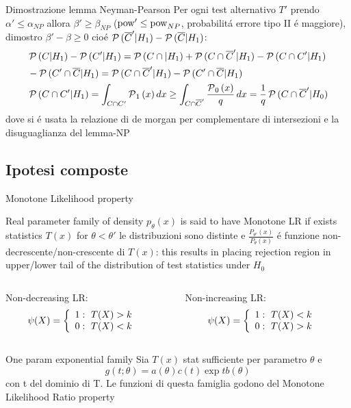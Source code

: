 \documentclass[asd-beamer.tex]{subfiles}
\begin{document}
\begin{wordonframe}{Dimostrazione lemma Neyman-Pearson}
Per ogni test alternativo $T'$ prendo $\alpha'\leq\alpha_{NP}$ allora $\beta'\geq\beta_{NP}$ ($\operatorname{pow}'\leq\operatorname{pow}_{NP}$, probabilit\'a errore tipo II \'e maggiore), dimostro $\beta'-\beta\geq0$ cio\'e $\operatorname{\mathcal{P}}{(\overline{C}'|H_1)}-\operatorname{\mathcal{P}}{(\overline{C}|H_1)}$:
\begin{align*}
&\operatorname{\mathcal{P}}{(C|H_1)}-\operatorname{\mathcal{P}}{(C'|H_1)}=\operatorname{\mathcal{P}}{(C\cap|H_1)}+\operatorname{\mathcal{P}}{(C\cap\overline{C}'|H_1)}-\operatorname{\mathcal{P}}{(C\cap C'|H_1)}\\
&-\operatorname{\mathcal{P}}{(C'\cap\overline{C}|H_1)}=\operatorname{\mathcal{P}}{(C\cap\overline{C}'|H_1)}-\operatorname{\mathcal{P}}{(C'\cap\overline{C}|H_1)}\\
&\operatorname{\mathcal{P}}{(C\cap C'|H_1)}=\int_{C\cap C'}\operatorname{\mathcal{P}}_1{(x)}\,dx\geq\int_{C\cap \overline{C}'}\frac{\operatorname{\mathcal{P}}_0{(x)}}{q}\,dx=\frac{1}{q}\operatorname{\mathcal{P}}{(C\cap\overline{C}'|H_0)}
\end{align*}
dove si \'e usata la relazione di de morgan per complementare di intersezioni e la disuguaglianza del lemma-NP
\end{wordonframe}

\subsection{Ipotesi composte}

\begin{frame}{Monotone Likelihood property}\frameintoc
\begin{block}{}
Real parameter family of density $p_{\theta}(x)$ is said to have Monotone LR if exists statistics $T(x)$ for $\theta<\theta'$ le distribuzioni sono distinte e $\frac{P_{\theta'}(x)}{P_{\theta}(x)}$ \'e funzione non-decrescente/non-crescente di $T(x)$: this results in placing rejection region in upper/lower tail of the distribution of test statistics under $H_0$
\begin{columns}[T]
	\begin{column}{0.5\textwidth}
		Non-decreasing LR:
		\begin{align*}
		&\psi(X)=\left\{\begin{array}{l}1:\ T(X)>k\\0:\ T(X)<k\\ \end{array}\right.
		\end{align*}
	\end{column}
	\begin{column}{0.5\textwidth}
		Non-increasing LR:
		\begin{align*}
		&\psi(X)=\left\{\begin{array}{l}1:\ T(X)<k\\0:\ T(X)>k\\ \end{array}\right.
		\end{align*}
	\end{column}
\end{columns}
\end{block}
\begin{block}{One param exponential family}
Sia $T(x)$ stat sufficiente per parametro $\theta$ e 
\begin{equation*}
g(t;\theta)=a(\theta)c(t)\exp{tb(\theta)}
\end{equation*}
con t del dominio di T. Le funzioni di questa famiglia godono del Monotone Likelihood Ratio property
\end{block}
\end{frame}
\end{document}
